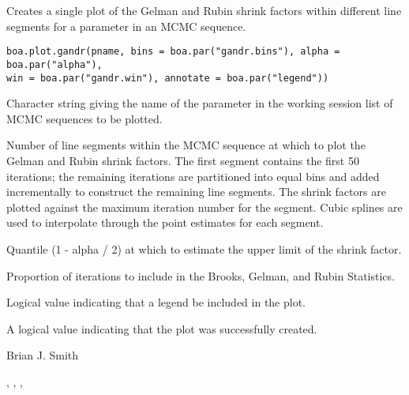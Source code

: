 \begin{Description}\relax
Creates a single plot of the Gelman and Rubin shrink factors within different 
line segments for a parameter in an MCMC sequence.
\end{Description}
\begin{Usage}
\begin{verbatim}
boa.plot.gandr(pname, bins = boa.par("gandr.bins"), alpha = boa.par("alpha"),
win = boa.par("gandr.win"), annotate = boa.par("legend"))
\end{verbatim}
\end{Usage}
\begin{Arguments}
\begin{ldescription}
\item[\code{pname}] Character string giving the name of the parameter in the working 
session list of MCMC sequences to be plotted.
\item[\code{bins}] Number of line segments within the MCMC sequence at which to plot 
the Gelman and Rubin shrink factors. The first segment contains the first 50 
iterations; the remaining iterations are partitioned into equal bins and 
added incrementally to construct the remaining line segments. The shrink 
factors are plotted against the maximum iteration number for the segment. 
Cubic splines are used to interpolate through the point estimates for each 
segment.
\item[\code{alpha}] Quantile (1 - alpha / 2) at which to estimate the upper limit of 
the shrink factor.
\item[\code{win}] Proportion of iterations to include in the Brooks, Gelman, and 
Rubin Statistics.
\item[\code{annotate}] Logical value indicating that a legend be included in the plot.
\end{ldescription}
\end{Arguments}
\begin{Value}
A logical value indicating that the plot was successfully created.
\end{Value}
\begin{Author}\relax
Brian J. Smith
\end{Author}
\begin{SeeAlso}\relax
{}, ,
, 
\end{SeeAlso}

